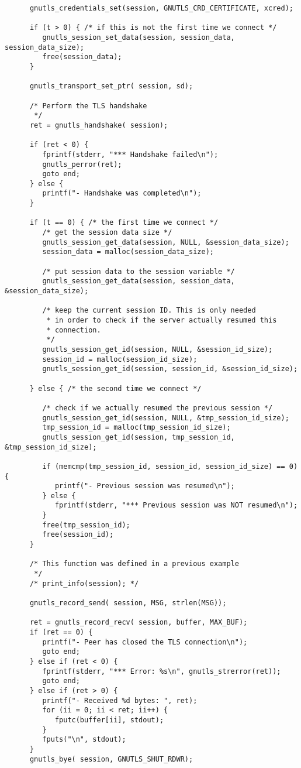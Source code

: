 \begin{verbatim}
      gnutls_credentials_set(session, GNUTLS_CRD_CERTIFICATE, xcred);

      if (t > 0) { /* if this is not the first time we connect */
         gnutls_session_set_data(session, session_data, session_data_size);
         free(session_data);
      }
      
      gnutls_transport_set_ptr( session, sd);

      /* Perform the TLS handshake
       */
      ret = gnutls_handshake( session);

      if (ret < 0) {
         fprintf(stderr, "*** Handshake failed\n");
         gnutls_perror(ret);
         goto end;
      } else {
         printf("- Handshake was completed\n");
      }

      if (t == 0) { /* the first time we connect */
         /* get the session data size */
         gnutls_session_get_data(session, NULL, &session_data_size);
         session_data = malloc(session_data_size);

         /* put session data to the session variable */
         gnutls_session_get_data(session, session_data, &session_data_size);

         /* keep the current session ID. This is only needed
          * in order to check if the server actually resumed this
          * connection.
          */
         gnutls_session_get_id(session, NULL, &session_id_size);
         session_id = malloc(session_id_size);
         gnutls_session_get_id(session, session_id, &session_id_size);

      } else { /* the second time we connect */

         /* check if we actually resumed the previous session */
         gnutls_session_get_id(session, NULL, &tmp_session_id_size);
         tmp_session_id = malloc(tmp_session_id_size);
         gnutls_session_get_id(session, tmp_session_id, &tmp_session_id_size);

         if (memcmp(tmp_session_id, session_id, session_id_size) == 0) {
            printf("- Previous session was resumed\n");
         } else {
            fprintf(stderr, "*** Previous session was NOT resumed\n");
         }
         free(tmp_session_id);
         free(session_id);
      }

      /* This function was defined in a previous example
       */
      /* print_info(session); */

      gnutls_record_send( session, MSG, strlen(MSG));

      ret = gnutls_record_recv( session, buffer, MAX_BUF);
      if (ret == 0) {
         printf("- Peer has closed the TLS connection\n");
         goto end;
      } else if (ret < 0) {
         fprintf(stderr, "*** Error: %s\n", gnutls_strerror(ret));
         goto end;
      } else if (ret > 0) {
         printf("- Received %d bytes: ", ret);
         for (ii = 0; ii < ret; ii++) {
            fputc(buffer[ii], stdout);
         }
         fputs("\n", stdout);
      }
      gnutls_bye( session, GNUTLS_SHUT_RDWR);


\end{verbatim}
